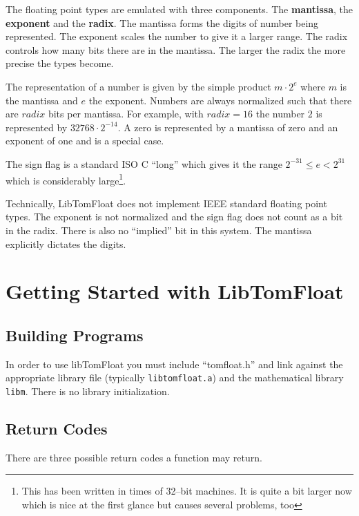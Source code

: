 \documentclass[a4paper]{book}
\theoremstyle{definition}
\theoremstyle{remark}
\begin{document}
 
The floating point types are emulated with three components. The \textbf{mantissa}, the \textbf{exponent} and the \textbf{radix}. The mantissa forms the digits of number being represented. The exponent scales the number to give it a larger range.  The radix controls how many bits there are in the mantissa.  The larger the radix the more precise the types become.  

The representation of a number is given by the simple product $m \cdot 2^e$ where $m$ is the mantissa and $e$ the exponent.  Numbers are always normalized such that there are $radix$ bits per mantissa.  For example, with $radix = 16$ the number $2$ is represented by $32768 \cdot 2^{-14}$.  A zero is represented by a mantissa of zero and an exponent of one and is a special case.

The sign flag is a standard ISO C ``long'' which gives it the range $2^{-31} \le e < 2^{31}$ which is considerably large\footnote{This has been written in times of 32--bit machines. It is quite a bit larger now which is nice at the first glance but causes several problems, too}.

Technically, LibTomFloat does not implement IEEE standard floating point types.  The exponent is not normalized and the sign flag does not count as a bit in the radix.  There is also no ``implied'' bit in this system. The mantissa explicitly dictates the digits.

\chapter{Getting Started with LibTomFloat}
\section{Building Programs}
In order to use libTomFloat you must include ``tomfloat.h'' and link against the appropriate library file (typically {\texttt {libtomfloat.a}}) and the mathematical library {\texttt {libm}}.  There is no library initialization.

\section{Return Codes}
There are three possible return codes a function may return.
\end{document}
